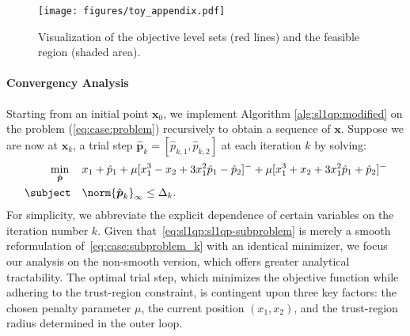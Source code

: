 \begin{figure}[htbp]
    \centering
    \texttt{[image: figures/toy\_appendix.pdf]}
    \caption{Visualization of the objective level sets (red lines) and the feasible region (shaded area).}
    \label{fig:prob_illustration}
\end{figure}
\paragraph{Convergency Analysis} Starting from an initial point $\boldsymbol{x}_0$, we implement Algorithm \ref{alg:sl1qp:modified} on the problem (\ref{eq:case:problem}) recursively to obtain a sequence of $\boldsymbol{x}$. Suppose we are now at $\boldsymbol{x}_k$, a trial step $\hat{\boldsymbol{p}}_k = [\hat{p}_{k,1},\hat{p}_{k,2}]$ at each iteration $k$ by solving:
\begin{align}\label{eq:case:subproblem_k}
\min_{\hat{\boldsymbol{p}}} \, & \quad x_1 + \hat{p}_1 + \mu[x_1^3-x_2+3x_1^2\hat{p}_1-\hat{p}_2]^- + \mu[x_1^3+x_2+3x_1^2\hat{p}_1+\hat{p}_2]^-\\
\subject & \quad \norm{\hat{\boldsymbol{p}}_k}_\infty \leq \Delta_k.\notag
\end{align}
For simplicity, we abbreviate the explicit dependence of certain variables on the iteration number $k$. Given that~\eqref{eq:sl1qp:sl1qp-subproblem} is merely a smooth reformulation of~\eqref{eq:case:subproblem_k} with an identical minimizer, we focus our analysis on the non-smooth version, which offers greater analytical tractability. The optimal trial step, which minimizes the objective function while adhering to the trust-region constraint, is contingent upon three key factors: the chosen penalty parameter $\mu$, the current position $(x_1, x_2)$, and the trust-region radius determined in the outer loop.




